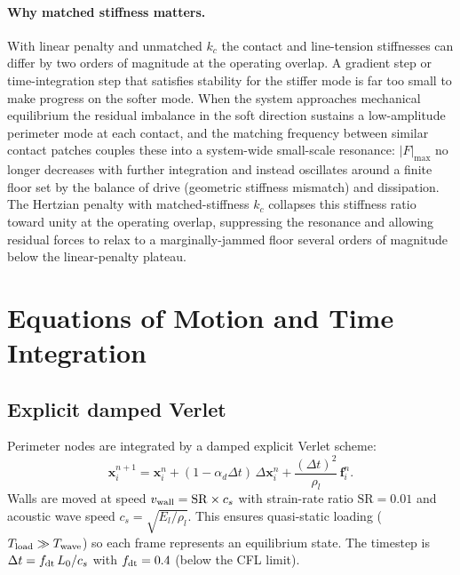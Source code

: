 \documentclass[aps,pre,twocolumn,floatfix,longbibliography]{revtex4-2}
\newcommand{\El}{E_l}
\newcommand{\SR}{\mathrm{SR}}
\begin{document}
\paragraph{Why matched stiffness matters.}
With linear penalty and unmatched $k_c$ the contact and line-tension
stiffnesses can differ by two orders of magnitude at the operating overlap.
A gradient step or time-integration step that satisfies stability for the
stiffer mode is far too small to make progress on the softer mode.  When
the system approaches mechanical equilibrium the residual imbalance in the
soft direction sustains a low-amplitude perimeter mode at each contact, and
the matching frequency between similar contact patches couples these into a
system-wide small-scale resonance: $|F|_{\max}$ no longer decreases with
further integration and instead oscillates around a finite floor set by the
balance of drive (geometric stiffness mismatch) and dissipation.  The
Hertzian penalty with matched-stiffness $k_c$ collapses this stiffness ratio
toward unity at the operating overlap, suppressing the resonance and
allowing residual forces to relax to a marginally-jammed floor several
orders of magnitude below the linear-penalty plateau.

\section{Equations of Motion and Time Integration}
\label{sec:eom}

\subsection{Explicit damped Verlet}

Perimeter nodes are integrated by a damped explicit Verlet scheme:
\begin{equation}
  \mathbf{x}_i^{n+1} = \mathbf{x}_i^n + (1-\alpha_d \Delta t)\,\Delta\mathbf{x}_i^n
  + \frac{(\Delta t)^2}{\rho_l}\,\mathbf{f}_i^n.
\label{eq:verlet}
\end{equation}
Walls are moved at speed $v_{\rm wall} = \SR \times c_s$ with strain-rate ratio
$\SR = 0.01$ and acoustic wave speed $c_s = \sqrt{\El/\rho_l}$.  This ensures
quasi-static loading ($T_{\rm load} \gg T_{\rm wave}$) so each frame represents
an equilibrium state.  The timestep is $\Delta t = f_{\rm dt}\, L_0/c_s$ with
$f_{\rm dt} = 0.4$ (below the CFL limit).
\end{document}
